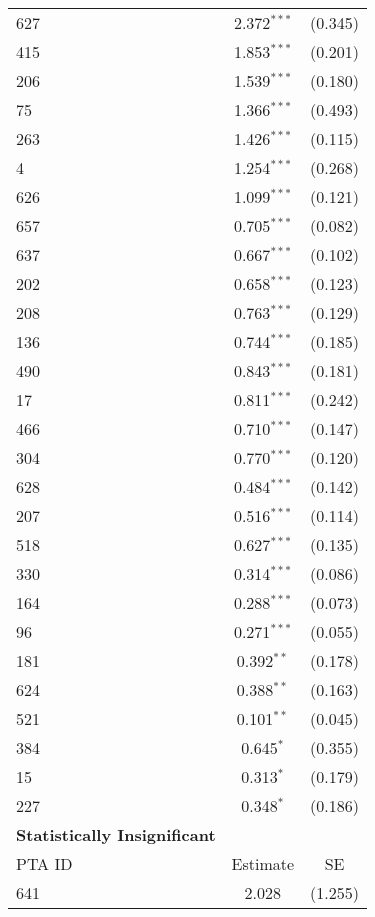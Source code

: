 \begin{longtable}{lcc}
    627 & 2.372$^{\ast\ast\ast}$ & (0.345) \\
    415 & 1.853$^{\ast\ast\ast}$ & (0.201) \\
    206 & 1.539$^{\ast\ast\ast}$ & (0.180) \\
    75  & 1.366$^{\ast\ast\ast}$ & (0.493) \\
    263 & 1.426$^{\ast\ast\ast}$ & (0.115) \\
    4   & 1.254$^{\ast\ast\ast}$ & (0.268) \\
    626 & 1.099$^{\ast\ast\ast}$ & (0.121) \\
    657 & 0.705$^{\ast\ast\ast}$ & (0.082) \\
    637 & 0.667$^{\ast\ast\ast}$ & (0.102) \\
    202 & 0.658$^{\ast\ast\ast}$ & (0.123) \\
    208 & 0.763$^{\ast\ast\ast}$ & (0.129) \\
    136 & 0.744$^{\ast\ast\ast}$ & (0.185) \\
    490 & 0.843$^{\ast\ast\ast}$ & (0.181) \\
    17  & 0.811$^{\ast\ast\ast}$ & (0.242) \\
    466 & 0.710$^{\ast\ast\ast}$ & (0.147) \\
    304 & 0.770$^{\ast\ast\ast}$ & (0.120) \\
    628 & 0.484$^{\ast\ast\ast}$ & (0.142) \\
    207 & 0.516$^{\ast\ast\ast}$ & (0.114) \\
    518 & 0.627$^{\ast\ast\ast}$ & (0.135) \\
    330 & 0.314$^{\ast\ast\ast}$ & (0.086) \\
    164 & 0.288$^{\ast\ast\ast}$ & (0.073) \\
    96 & 0.271$^{\ast\ast\ast}$ & (0.055) \\
    181 & 0.392$^{\ast\ast}$ & (0.178) \\
    624 & 0.388$^{\ast\ast}$ & (0.163) \\
    521 & 0.101$^{\ast\ast}$ & (0.045) \\
    384  & 0.645$^{\ast}$ & (0.355) \\
    15  & 0.313$^{\ast}$ & (0.179) \\
    227 & 0.348$^{\ast}$ & (0.186) \\
    \hline
    \textbf{Statistically Insignificant} &  &  \\
    \hline
    PTA ID & Estimate & SE \\
    \hline
    641 & 2.028 & (1.255) \\

\end{longtable}
